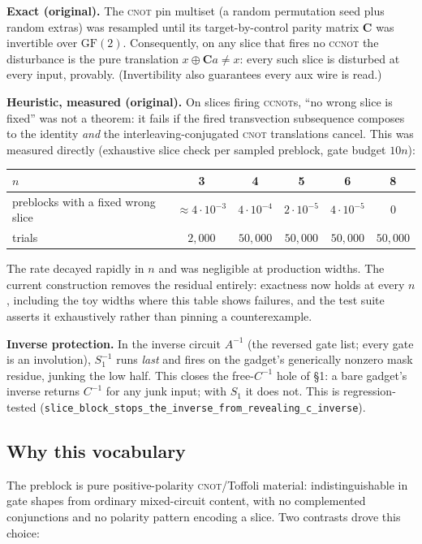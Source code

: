 \documentclass[11pt]{article}
\newcommand{\CNOT}{\textsc{cnot}}
\newcommand{\CCNOT}{\textsc{ccnot}}
\newcommand{\code}[1]{\texttt{#1}}
\newcommand{\Sone}{S_1}
\begin{document}
\textbf{Exact (original).} The \CNOT{} pin multiset (a random permutation seed
plus random extras) was resampled until its target-by-control parity matrix
$\mathbf{C}$ was invertible over $\mathrm{GF}(2)$. Consequently, on any slice
that fires no \CCNOT{} the disturbance is the pure translation
$x \oplus \mathbf{C}a \neq x$: every such slice is disturbed at every input,
provably. (Invertibility also guarantees every aux wire is read.)

\textbf{Heuristic, measured (original).} On slices firing \CCNOT{}s, ``no wrong
slice is fixed'' was not a theorem: it fails if the fired transvection
subsequence composes to the identity \emph{and} the interleaving-conjugated
\CNOT{} translations cancel. This was measured directly (exhaustive slice check
per sampled preblock, gate budget $10n$):

\begin{center}
\begin{tabular}{lccccc}
\toprule
$n$ & 3 & 4 & 5 & 6 & 8 \\
\midrule
preblocks with a fixed wrong slice &
$\approx 4\cdot 10^{-3}$ & $4\cdot 10^{-4}$ & $2\cdot 10^{-5}$ & $4\cdot 10^{-5}$ & $0$ \\
trials & $2{,}000$ & $50{,}000$ & $50{,}000$ & $50{,}000$ & $50{,}000$ \\
\bottomrule
\end{tabular}
\end{center}

The rate decayed rapidly in $n$ and was negligible at production widths. The
current construction removes the residual entirely: exactness now holds at
every $n$, including the toy widths where this table shows failures, and the
test suite asserts it exhaustively rather than pinning a counterexample.

\textbf{Inverse protection.} In the inverse circuit $A^{-1}$ (the reversed
gate list; every gate is an involution), $\Sone^{-1}$ runs \emph{last} and
fires on the gadget's generically nonzero mask residue, junking the low
half. This closes the free-$C^{-1}$ hole of \S1: a bare gadget's inverse
returns $C^{-1}$ for any junk input; with $\Sone$ it does not. This is
regression-tested
(\code{slice\_block\_stops\_the\_inverse\_from\_revealing\_c\_inverse}).

\subsection{Why this vocabulary}

The preblock is pure positive-polarity \CNOT{}/Toffoli material:
indistinguishable in gate shapes from ordinary mixed-circuit content, with
no complemented conjunctions and no polarity pattern encoding a slice. Two
contrasts drove this choice:
\end{document}
